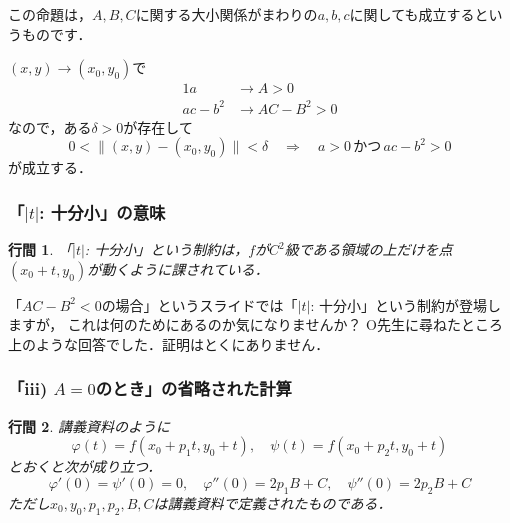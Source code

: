 \documentclass[uplatex]{jsarticle}
\makeatletter
\renewenvironment{proof}[1][\proofname]{\par
        \pushQED{\qed}
        \normalfont
        \topsep6\p@\@plus6\p@ \trivlist
        \item[\hskip\labelsep{\bfseries #1}\@addpunct{\bfseries}]\ignorespaces
    }{%
        \popQED\endtrivlist\@endpefalse
    }
\renewcommand{\proofname}{\underline{証明.}}
\newtheorem{proposition}{行間}
\makeatother
\begin{document}
この命題は，$A, B, C$に関する大小関係がまわりの$a, b, c$に関しても成立するというものです．

\begin{proof}
    $(x, y) \rightarrow (x_0, y_0)$で
    \begin{alignat}{1}
        a &\rightarrow A > 0 \\
        ac - b^2 &\rightarrow AC - B^2 > 0
    \end{alignat}
    なので，ある$\delta > 0$が存在して
    \begin{equation}
        0 < \| (x, y) - (x_0, y_0) \| < \delta
        \quad \Longrightarrow \quad
        a > 0
        \,\mbox{かつ}\,
        ac - b^2 > 0
    \end{equation}
    が成立する．
\end{proof}

\subsubsection{「$|t|$: 十分小」の意味}
\begin{screen}
    \begin{proposition}
        「$|t|$: 十分小」という制約は，$f$が$C^2$級である領域の上だけを点$(x_0 + t, y_0)$が動くように課されている．
    \end{proposition}
\end{screen}

「$AC-B^2<0$の場合」というスライドでは「$|t|$: 十分小」という制約が登場しますが，
これは何のためにあるのか気になりませんか？
O先生に尋ねたところ上のような回答でした．証明はとくにありません．

\subsubsection{「iii) $A=0$のとき」の省略された計算}
\begin{screen}
    \begin{proposition}
        講義資料のように
        \begin{equation}
            \varphi(t) = f(x_0 + p_1 t, y_0 + t),
            \quad
            \psi(t)    = f(x_0 + p_2 t, y_0 + t)
        \end{equation}
        とおくと次が成り立つ．
        \begin{equation}
            \varphi'(0) = \psi'(0) = 0,
            \quad
            \varphi''(0) = 2p_1 B + C,
            \quad
            \psi''(0)    = 2p_2 B + C
        \end{equation}
        ただし$x_0, y_0, p_1, p_2, B, C$は講義資料で定義されたものである．
    \end{proposition}
\end{screen}
\end{document}
